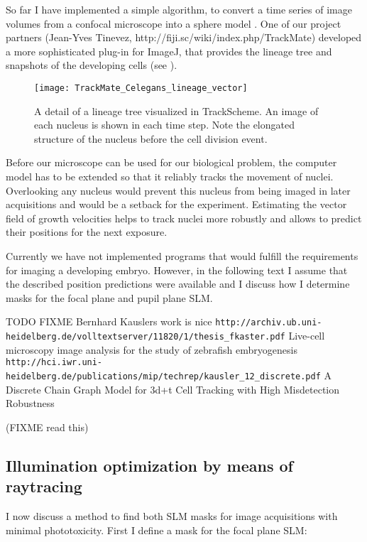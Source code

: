 So far I have implemented a simple algorithm, to convert a time series
of image volumes from a confocal microscope into a sphere model
\citep{Santella2010}.  One of our project partners (Jean-Yves Tinevez,
http://fiji.sc/wiki/index.php/TrackMate) developed a more
sophisticated plug-in for ImageJ, that provides the lineage tree and
snapshots of the developing cells (see ).
\begin{figure}[!hbt] \centering
  \qquad
  \texttt{[image: TrackMate\_Celegans\_lineage\_vector]}
  \caption{ A detail of a lineage tree visualized in TrackScheme. An
    image of each nucleus is shown in each time step. Note the
    elongated structure of the nucleus before the cell division
    event.}
  \label{fig:trackmate}
\end{figure} Before our microscope can be used for our biological
problem, the computer model has to be extended so that it reliably
tracks the movement of nuclei.  Overlooking any nucleus would prevent
this nucleus from being imaged in later acquisitions and would be a
setback for the experiment.  Estimating the vector field of growth
velocities helps to track nuclei more robustly and allows to predict
their positions for the next exposure.

Currently we have not implemented programs that would fulfill the
requirements for imaging a developing embryo.  However, in the
following text I assume that the described position predictions were
available and I discuss how I determine masks for the focal plane and
pupil plane SLM.

\cite{Murray2006}

TODO FIXME Bernhard Kauslers work is nice
\verb!http://archiv.ub.uni-heidelberg.de/volltextserver/11820/1/thesis_fkaster.pdf!
Live-cell microscopy image analysis for the study of zebrafish embryogenesis
\verb!http://hci.iwr.uni-heidelberg.de/publications/mip/techrep/kausler_12_discrete.pdf!
A Discrete Chain Graph Model for
  3d+t Cell Tracking with High
    Misdetection Robustness

(FIXME read this)


\subsection{Illumination optimization by means of raytracing} 
I now discuss a method to find both SLM masks for image acquisitions
with minimal phototoxicity. First I define a mask for the focal plane
SLM:

